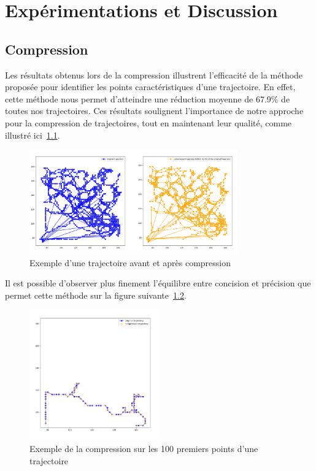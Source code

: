 \chapter{Expérimentations et Discussion}
\section{Compression}


Les résultats obtenus lors de la compression illustrent l'efficacité de la méthode proposée pour identifier les points caractéristiques d'une trajectoire. En effet, cette méthode nous permet d'atteindre une réduction moyenne de 67.9\% de toutes nos trajectoires. Ces résultats soulignent l'importance de notre approche pour la compression de trajectoires, tout en maintenant leur qualité, comme illustré ici~\ref{fig:traj_versus}.

\begin{figure}[h!]
    \centering
    \includegraphics[width=0.8\textwidth]{Images/compVSorigAll.png}
    \caption{Exemple d'une trajectoire avant et après compression}
    \label{fig:traj_versus}
\end{figure}

Il est possible d'observer plus finement l'équilibre entre concision et précision que permet cette méthode sur la figure suivante~\ref{fig:traj_versus100}.

\begin{figure}[h!]
    \centering
    \includegraphics[width=0.5\textwidth]{Images/compVSoriginal100.png}
    \caption{Exemple de la compression sur les 100 premiers points d'une trajectoire}
    \label{fig:traj_versus100}
\end{figure}
\newpage
